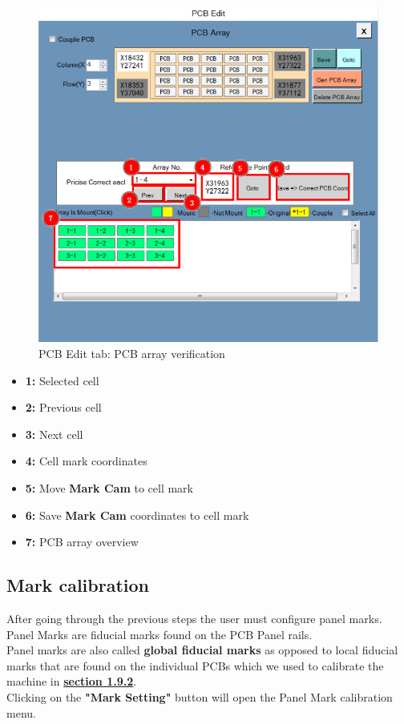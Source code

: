 \documentclass[a4paper,10pt]{report}
\begin{document}
\begin{figure}[!htb]
 \centering
 \includegraphics[width=1\textwidth]{scrot14.png}
 \caption{PCB Edit tab: PCB array verification}
\end{figure}
\begin{itemize}
 \item \textbf{1: } Selected cell
 \item \textbf{2: } Previous cell
 \item \textbf{3: } Next cell
 \item \textbf{4: } Cell mark coordinates
 \item \textbf{5: } Move \textbf{Mark Cam} to cell mark
 \item \textbf{6: } Save \textbf{Mark Cam} coordinates to cell mark
 \item \textbf{7: } PCB array overview
\end{itemize}
\newpage
\subsection{Mark calibration}
\label{sec:1.9.4}
After going through the previous steps the user must configure panel marks. Panel Marks are fiducial marks found on the PCB Panel rails.\\

Panel marks are also called \textbf{global fiducial marks} as opposed to local fiducial marks that are found on the individual PCBs which we used to calibrate the machine in \textbf{\hyperref[sec:1.9.2]{section 1.9.2}}.\\
Clicking on the \textbf{"Mark Setting"} button will open the Panel Mark calibration menu.\\
\end{document}
